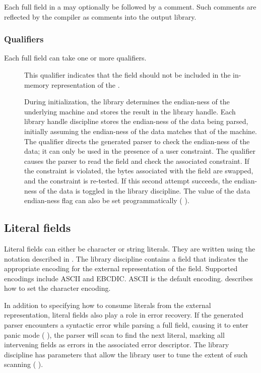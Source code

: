 Each full field in a \struct{} may optionally be followed by a \padsl{}
comment. Such comments are reflected by the \pads{} compiler as
comments into the output library. 

\subsubsection{Qualifiers}
Each full field can take one or more qualifiers.
\begin{description}
\item[\pomit{}] This qualifier indicates that the field
  should not be included in the in-memory representation of the
  \struct{}. 
\item[\pendian{}] During initialization, the \pads{} library
  determines the endian-ness of the underlying machine and stores the
  result in the library handle.  Each library handle discipline stores
  the endian-ness of the data being parsed, initially assuming the
  endian-ness of the data matches that of the machine.  The \pendian{}
  qualifier directs the generated parser to check the endian-ness of
  the data; it can only be used in the presence of a user constraint.
  The qualifier causes the parser to read the field and check the
  associated constraint.  If the constraint is violated, the bytes
  associated with the field are swapped, and the constraint is
  re-tested.  If this second attempt succeeds, the endian-ness of the
  data is toggled in the library discipline.  The value of the data
  endian-ness flag can also be set programmatically (\cf
  ).
\end{description}

\subsection{Literal fields}
Literal fields can either be character or string literals.  They are
written using the notation described in .  
The library discipline contains a field that indicates the appropriate
encoding for the external representation of the field.  Supported
encodings include ASCII and EBCDIC.  ASCII is the default encoding.  
 describes how
to set the character encoding.  


In addition to specifying how to consume literals from the external
representation, literal fields also play a role in error recovery.  If
the generated parser encounters a syntactic error while parsing a full
field, causing it to enter panic mode (\cf{}
), the parser will scan to find the next
literal, marking all intervening fields as errors in the
associated error descriptor.  The library discipline has parameters
that allow the library user to tune the extent of such scanning
(\cf{} ).

